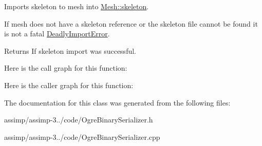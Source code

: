 Imports skeleton to {\ttfamily mesh} into \hyperlink{class_assimp_1_1_ogre_1_1_mesh_a6014a537b7b71a46e24ba56c6c2d738b}{Mesh\+::skeleton}. 

If mesh does not have a skeleton reference or the skeleton file cannot be found it is not a fatal \hyperlink{class_deadly_import_error}{Deadly\+Import\+Error}. \begin{DoxyReturn}{Returns}
If skeleton import was successful. 
\end{DoxyReturn}


Here is the call graph for this function\+:




Here is the caller graph for this function\+:




The documentation for this class was generated from the following files\+:\begin{DoxyCompactItemize}
\item 
assimp/assimp-\/3../code/Ogre\+Binary\+Serializer.\+h\item 
assimp/assimp-\/3../code/Ogre\+Binary\+Serializer.\+cpp\end{DoxyCompactItemize}

